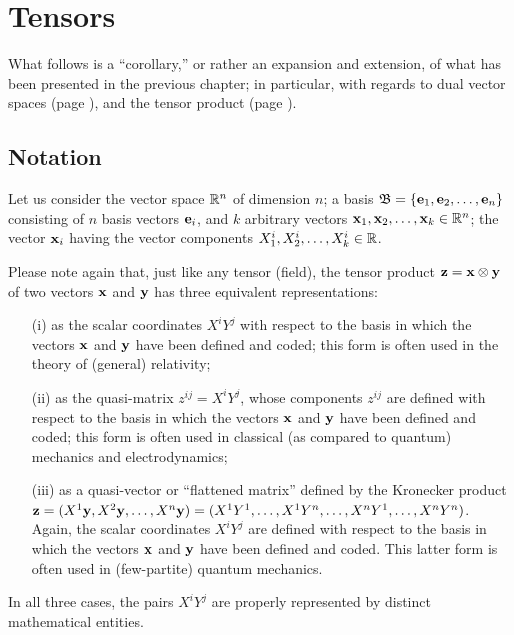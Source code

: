 \chapter{Tensors}
\label{ch:t}


What follows is a ``corollary,'' or rather an expansion and extension,
of what has been presented in the previous chapter; in particular, with regards to dual vector spaces
(page
\pageref{2011-m-dvs}),
and the tensor product
(page
\pageref{2011-m-tensorp}).

\section{Notation}

Let us consider the vector space ${\Bbb R}^n$ of dimension $n$;
a basis
${\mathfrak B}=\{{\bf e}_1,{\bf e}_2,\ldots ,{\bf e}_n\}$ consisting of
$n$ basis vectors ${\bf e}_i$,
and $k$ arbitrary vectors
${\bf x}_1,{\bf x}_2,\ldots ,{\bf x}_k\in {\Bbb R}^n$;
the vector ${\bf x}_i$ having the vector components
$X^i_1,X^i_2,\ldots ,X^i_k\in {\Bbb R}$.


Please note again that,
just like any tensor (field), the tensor product
${\bf z} = {\bf x} \otimes {\bf y}$   of two vectors ${\bf x}$ and ${\bf y}$   has three equivalent  representations:
\begin{itemize}
\item[(i)]
as the scalar coordinates $X^iY^j$ with respect to the basis in which the vectors ${\bf  x}$ and ${\bf y}$ have been defined and coded;
this form is often used in the theory of (general) relativity;
\item[(ii)]
as the quasi-matrix $z^{ij}  =X^iY^j$, whose components $z^{ij}$ are
defined with respect to the basis in which the vectors ${\bf  x}$ and ${\bf y}$ have been defined and coded;
this form is often used in classical (as compared to quantum) mechanics and electrodynamics;
\item[(iii)]
as a quasi-vector or ``flattened matrix'' defined by the Kronecker product
${\bf z} = (X^1  {\bf y}, X^2  {\bf y}, \ldots , X^n  {\bf y})=
(X^1  { Y}^1, \ldots ,X^1  { Y}^n, \ldots  ,X^n  { Y}^1, \ldots , X^n  { Y}^n)
$. Again, the scalar coordinates $X^iY^j$ are defined
with respect to the basis in which the vectors ${\bf  x}$ and ${\bf y}$ have been defined and coded.
This latter form is often used in (few-partite) quantum mechanics.
\end{itemize}
In all three cases, the pairs $X^iY^j$  are properly represented by distinct mathematical entities.


